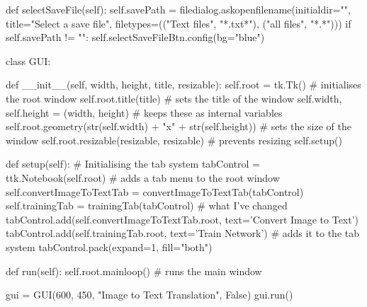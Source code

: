 \documentclass{report}
\begin{document}
\begin{python}
    def selectSaveFile(self):
        self.savePath = filedialog.askopenfilename(initialdir="",
                                  title="Select a save file",
                                  filetypes=(("Text files", "*.txt*"),
                                  ("all files", "*.*")))
        if self.savePath != "":
            self.selectSaveFileBtn.config(bg="blue")


class GUI:

    def __init__(self, width, height, title, resizable):
        self.root = tk.Tk()  # initialises the root window
        self.root.title(title)  # sets the title of the window
        self.width, self.height = (width, height)  # keeps these as internal variables
        self.root.geometry(str(self.width) + "x" + str(self.height))  # sets the size of the window
        self.root.resizable(resizable, resizable)  # prevents resizing
        self.setup()

    def setup(self):
        # Initialising the tab system
        tabControl = ttk.Notebook(self.root)  # adds a tab menu to the root window
        self.convertImageToTextTab = convertImageToTextTab(tabControl)
        self.trainingTab = trainingTab(tabControl)  # what I've changed
        tabControl.add(self.convertImageToTextTab.root, text='Convert Image to Text')
        tabControl.add(self.trainingTab.root, text='Train Network')  # adds it to the tab system
        tabControl.pack(expand=1, fill="both")

    def run(self):
        self.root.mainloop()  # runs the main window

gui = GUI(600, 450, "Image to Text Translation", False)
gui.run()
\end{python}
\end{document}
